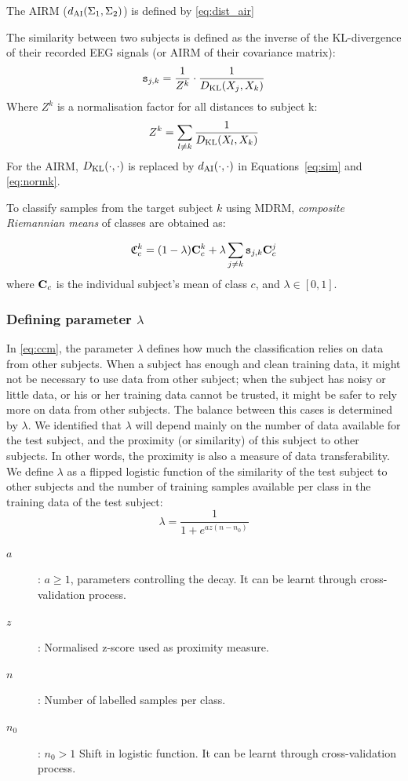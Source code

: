 The AIRM ($d_{\operatorname{AI}}(\Sigma_1, \Sigma_2)$) is defined by \eqref{eq:dist_air}

The similarity between two subjects is defined as the inverse of the KL-divergence of their recorded EEG signals (or AIRM of their covariance matrix):
\begin{equation}
\simil_{j,k} = \frac{1}{Z^k} \cdot \frac{1}{\divB{KL}(\X_j, \X_k)}
\label{eq:sim}
\end{equation}
Where $Z^k$ is a normalisation factor for all distances to subject k:
\begin{equation}
Z^k = \sum_{l \neq k} \frac{1}{\divB{KL}(\X_l,\X_k)}
\label{eq:normk}
\end{equation} 
For the AIRM, $D_{\operatorname{KL}}(\cdot,\cdot)$ is replaced by $d_{\operatorname{AI}}(\cdot, \cdot)$ in Equations~\eqref{eq:sim} and \eqref{eq:normk}.

To classify samples from the target subject $k$ using MDRM, \emph{composite Riemannian means} of classes are obtained as:

\begin{equation}
\ccm^k = (1-\lambda)\cm^k + \lambda \sum_{j \neq k} \simil_{j,k} \cm^j
\label{eq:ccm}
\end{equation}
where $\mathbf{C}_c$ is the individual subject's mean of class $c$, and $\lambda \in [0,1]$.

\subsubsection{Defining parameter $\lambda$}

In \eqref{eq:ccm}, the parameter $\lambda$ defines how much the classification relies on data from other subjects. 
When a subject has enough and clean training data, it might not be necessary to use data from other subject; when the subject has noisy or little data, or his or her training data cannot be trusted, it might be safer to rely more on data from other subjects. The balance between this cases is determined by $\lambda$.
We identified that $\lambda$ will depend mainly on the number of data available for the test subject, and the proximity (or similarity) of this subject to other subjects. In other words, the proximity is also a measure of data transferability. 
We define $\lambda$ as a flipped logistic function of the similarity of the test subject to other subjects and the number of training samples available per class in the training data of the test subject:
\begin{equation}
\lambda = \frac{1}{1+e^{az(n-n_0)}}
\label{eq:lambda}
\end{equation}
\begin{description}
\item[$a$]: $a \geq 1$, parameters controlling the decay. It can be learnt through cross-validation process.
\item[$z$]: Normalised z-score used as proximity measure. 
\item[$n$]: Number of labelled samples per class.
\item[$n_0$]: $n_0 > 1$ Shift in logistic function. It can be learnt through cross-validation process.
\end{description}


